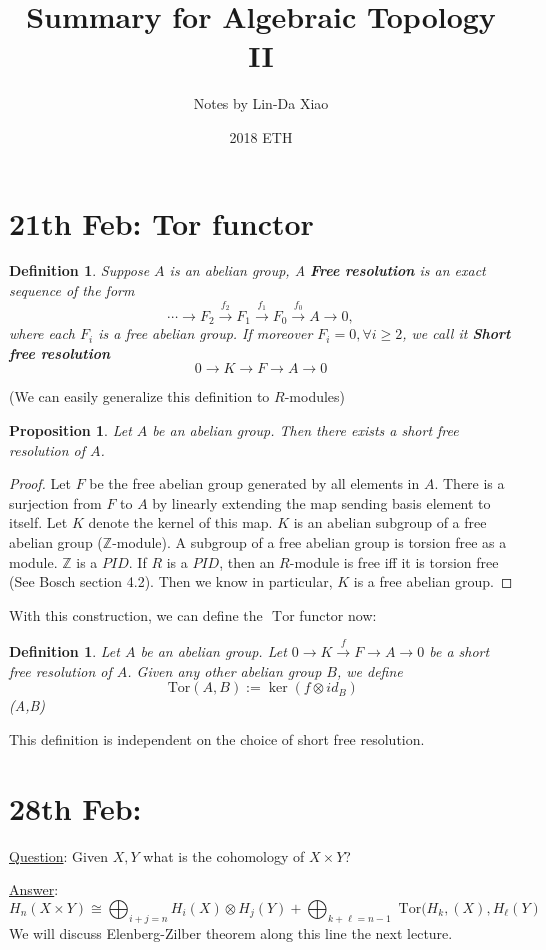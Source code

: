 \documentclass[11pt]{article}
\title{\bf Summary for Algebraic Topology II}
\author{Notes by Lin-Da Xiao}
\date{2018 ETH} %
\newtheorem{prop}[thm]{Proposition}
\newtheorem{dfn}[thm]{Definition}
\newcommand{\tor}{\text{ Tor}}
\newcommand{\intg}{\mathbb Z}
\newcommand{\rta}{\rightarrow}
\newcommand{\lrta}{\longrightarrow}
\begin{document}
\maketitle
\tableofcontents
\newpage
\section{21th Feb: Tor functor}
\begin{dfn}
Suppose $A$ is an abelian group, A \textbf{Free resolution} is an exact sequence of the form
$$
\cdots\lrta F_2\overset{f_2}{\lrta}F_1\overset{f_1}{\lrta}F_0\overset{f_0}{\lrta}A\lrta 0,
$$
where each $F_i$ is a free abelian group. If moreover $F_i=0,\forall i\geq 2$, we call it \textbf{Short free resolution} 
$$
0\lrta K\lrta F\lrta A\lrta 0
$$
\end{dfn}
(We can easily generalize this definition to $R$-modules)
\begin{prop}
Let $A$ be an abelian group. Then there exists a short free resolution of $A$.
\end{prop}
\begin{proof}
Let $F$ be the free abelian group generated by all elements in $A$. There is a surjection from $F$ to $A$ by linearly extending the map sending basis element to itself. Let $K$ denote the kernel of this map. $K$ is an abelian subgroup of a free abelian group ($\intg$-module).  A subgroup of a free abelian group is torsion free as a module. $\intg$ is a $PID$. If $R$ is a $PID$, then an  $R$-module is free iff it is torsion free (See Bosch section 4.2). Then we know in particular, $K$ is a free abelian group.
\end{proof}
With this construction, we can define the $\tor$ functor now:
\begin{dfn}
Let $A$ be an abelian group. Let $0\rta K\overset{f}{\rta}F\rta A\rta 0$ be a short free resolution of $A$. Given any other abelian group $B$, we define 
$$
\tor(A,B):=\ker(f\otimes id_B)
$$
\tor(A,B)
\end{dfn}

This definition is independent on the choice of short free resolution.

\section{28th Feb:}

\underline{Question}: Given $X, Y$ what is the cohomology of $X\times Y$?

\underline{Answer}:
$$
H_n(X\times Y)\cong \bigoplus_{i+j=n}H_i(X)\otimes H_j (Y)+\bigoplus_{k+\ell=n-1} \tor(H_k,(X),H_\ell(Y)
$$
We will discuss Elenberg-Zilber theorem along this line the next lecture.
\end{document}
